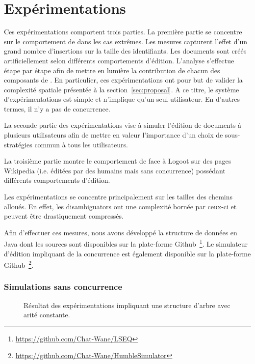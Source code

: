 
\section{Expérimentations}

Ces expérimentations comportent trois parties. La première partie se concentre
sur le comportement de \LSEQ dans les cas extrêmes. Les mesures capturent
l'effet d'un grand nombre d'insertions sur la taille des identifiants. Les
documents sont créés artificiellement selon différents comportements d'édition.
L'analyse s'effectue étape par étape afin de mettre en lumière la contribution
de chacun des composants de \LSEQ. En particulier, ces expérimentations ont pour
but de valider la complexité spatiale présentée à la section~\ref{sec:proposal}.
A ce titre, le système d'expérimentations est simple et n'implique qu'un seul
utilisateur. En d'autres termes, il n'y a pas de concurrence.


La seconde partie des expérimentations vise à simuler l'édition de documents à
plusieurs utilisateurs afin de mettre en valeur l'importance d'un choix de
sous-stratégies commun à tous les utilisateurs.

La troisième partie montre le comportement de \LSEQ face à Logoot sur des pages
Wikipedia (i.e. éditées par des humains mais sans concurrence) possédant
différents comportements d'édition.

Les expérimentations se concentre principalement sur les tailles des chemins
alloués. En effet, les disambiguators ont une complexité bornée par ceux-ci et
peuvent être drastiquement compressés.

Afin d'effectuer ces mesures, nous avons développé la structure de données \LSEQ
en Java dont les sources sont disponibles sur la plate-forme
Github~\footnote{\url{https://github.com/Chat-Wane/LSEQ}}. Le simulateur
d'édition impliquant de la concurrence est également disponible sur la
plate-forme
Github~\footnote{\url{https://github.com/Chat-Wane/HumbleSimulator}}.


\subsubsection{Simulations sans concurrence}

\begin{figure*}
  \centering
  \hspace{10pt}
  \caption{Résultat des expérimentations impliquant une structure d'arbre avec
    arité constante.}
\end{figure*}

